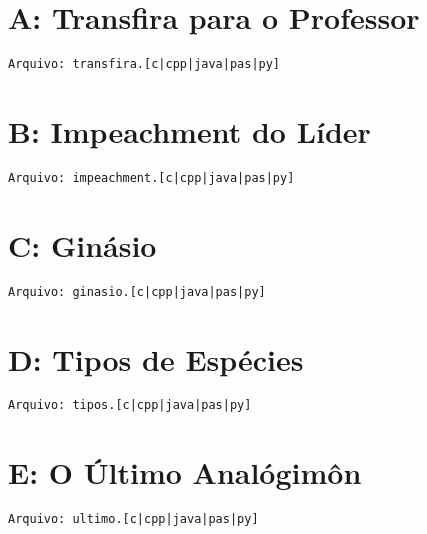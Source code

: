 \documentclass[12pt,oneside]{article} %
\begin{document}
\newpage

\clearpage
\section*{A: Transfira para o Professor} %
\vspace{-0.52cm}
\noindent \begin{verbatim}Arquivo: transfira.[c|cpp|java|pas|py]\end{verbatim}


\clearpage
\section*{B: Impeachment do Líder} %
\vspace{-0.52cm}
\noindent \begin{verbatim}Arquivo: impeachment.[c|cpp|java|pas|py]\end{verbatim}


\clearpage
\section*{C: Ginásio} %
\vspace{-0.52cm}
\noindent \begin{verbatim}Arquivo: ginasio.[c|cpp|java|pas|py]\end{verbatim}


\clearpage
\section*{D: Tipos de Espécies} %
\vspace{-0.52cm}
\noindent \begin{verbatim}Arquivo: tipos.[c|cpp|java|pas|py]\end{verbatim}


\clearpage
\section*{E: O Último Analógimôn} %
\vspace{-0.52cm}
\noindent \begin{verbatim}Arquivo: ultimo.[c|cpp|java|pas|py]\end{verbatim}


%
\end{document}
